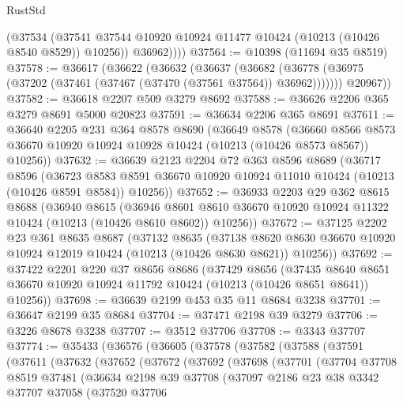 \begin{lexlean}{RustStd}
\begin{coremodule}
            (@37534
              (@37541 @37544 @10920 @10924 @11477 @10424 (@10213 (@10426 @8540 @8529)) @10256))
            @36962))))
@37564 := @10398 (@11694 @35 @8519)
@37578 := @36617
    (@36622
      (@36632
        (@36637
          (@36682 (@36778 (@36975 (@37202 (@37461 (@37467 (@37470 (@37561 @37564)) @36962)))))))
        @20967))
@37582 := @36618 @2207 @509 @3279 @8692
@37588 := @36626 @2206 @365 @3279 @8691 @5000 @20823
@37591 := @36634 @2206 @365 @8691
@37611 := @36640
    @2205
    @231
    @364
    @8578
    @8690
    (@36649
      @8578
      (@36660 @8566 @8573 @36670 @10920 @10924 @10928 @10424 (@10213 (@10426 @8573 @8567)) @10256))
@37632 := @36639
    @2123
    @2204
    @72
    @363
    @8596
    @8689
    (@36717
      @8596
      (@36723 @8583 @8591 @36670 @10920 @10924 @11010 @10424 (@10213 (@10426 @8591 @8584)) @10256))
@37652 := @36933
    @2203
    @29
    @362
    @8615
    @8688
    (@36940
      @8615
      (@36946 @8601 @8610 @36670 @10920 @10924 @11322 @10424 (@10213 (@10426 @8610 @8602)) @10256))
@37672 := @37125
    @2202
    @23
    @361
    @8635
    @8687
    (@37132
      @8635
      (@37138 @8620 @8630 @36670 @10920 @10924 @12019 @10424 (@10213 (@10426 @8630 @8621)) @10256))
@37692 := @37422
    @2201
    @220
    @37
    @8656
    @8686
    (@37429
      @8656
      (@37435 @8640 @8651 @36670 @10920 @10924 @11792 @10424 (@10213 (@10426 @8651 @8641)) @10256))
@37698 := @36639 @2199 @453 @35 @11 @8684 @3238
@37701 := @36647 @2199 @35 @8684
@37704 := @37471 @2198 @39 @3279
@37706 := @3226 @8678 @3238
@37707 := @3512 @37706
@37708 := @3343 @37707
@37774 := @35433
    (@36576
      (@36605
        (@37578
          (@37582
            (@37588
              (@37591
                (@37611
                  (@37632
                    (@37652
                      (@37672
                        (@37692
                          (@37698
                            (@37701
                              (@37704
                                @37708
                                @8519
                                @37481
                                (@36634
                                  @2198
                                  @39
                                  @37708
                                  (@37097
                                    @2186
                                    @23
                                    @38
                                    @3342
                                    @37707
                                    @37058
                                    (@37520
                                      @37706

\end{coremodule}
\end{lexlean}
